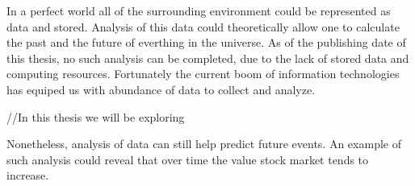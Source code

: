 In a perfect world all of the surrounding environment could be represented as data and stored.
Analysis of this data could theoretically allow one to calculate the past and the future of everthing in the universe.
As of the publishing date of this thesis, no such analysis can be completed, due to the lack of stored data and computing resources. 
Fortunately the current boom of information technologies has equiped us with abundance of data to collect and analyze.

//In this thesis we will be exploring 

Nonetheless, analysis of data can still help predict future events. 
An example of such analysis could reveal that over time the value stock market tends to increase. 